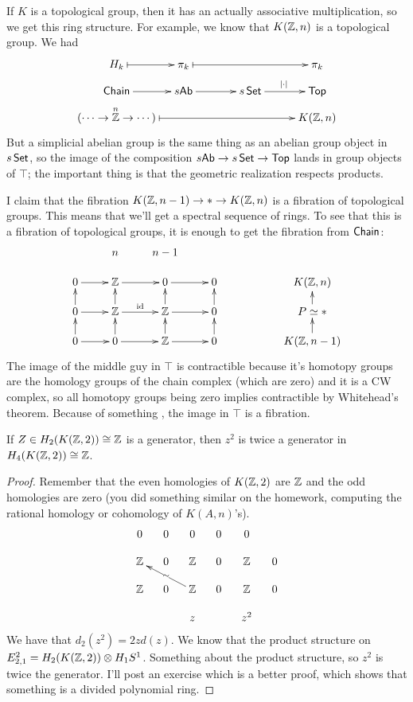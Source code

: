 \begin{example}
 If $K$ is a topological group, then it has an actually associative multiplication, so we get this ring structure. For example, we know that $K(\mathbb{Z},n)$ is a topological group. We had
 \[\xymatrix@!0 @R=2pc @C=5pc{
  H_k\ar@{|->}[r] & \pi_k \ar@{|->}[rr] & & \pi_k\\
  \chain \ar[r] & s\ab \ar[r] & s\set \ar[r]^{|\cdot|} & \top\\
  (\cdots\to \overset{n}{\ZZ}\to \cdots) \ar@{|->}[rrr] & & & K(\ZZ,n)
 }\]
 But a simplicial abelian group is the same thing as an abelian group object in $s\operatorname{\sf Set}$, so the image of the composition $s\text{\sf Ab}\to s\operatorname{\sf Set}\to \text{\sf Top}$ lands in group objects of $\top$; the important thing is that the geometric realization respects products.
 
 I claim that the fibration $K(\mathbb{Z},n-1)\to *\to K(\mathbb{Z},n)$ is a fibration of topological groups. This means that we'll get a spectral sequence of rings. To see that this is a fibration of topological groups, it is enough to get the fibration from $\text{\sf Chain}$:
 \[\xymatrix@R-1pc{
  & n & n-1 \\
  0\ar[r] & \ZZ \ar[r] & 0\ar[r] & 0 & & K(\ZZ,n)\\
  0\ar[r]\ar[u] & \ZZ\ar[u]\ar[r]^\id & \ZZ\ar[u] \ar[r] & 0\ar[u] & & P\simeq *\ar[u]\\
  0\ar[r]\ar[u] & 0\ar[u]\ar[r] & \ZZ \ar[r]\ar[u] & 0\ar[u] & & K(\ZZ,n-1)\ar[u]
 }\]
 The image of the middle guy in $\top$ is contractible because it's homotopy groups are the homology groups of the chain complex (which are zero) and it is a CW complex, so all homotopy groups being zero implies contractible by Whitehead's theorem. Because of something \anton{}, the image in $\top$ is a fibration.
\end{example}
\begin{lemma}
 If $Z\in H_2(K(\mathbb{Z},2))\cong \mathbb{Z}$ is a generator, then $z^2$ is twice a generator in $H_4(K(\mathbb{Z},2))\cong \mathbb{Z}$.
\end{lemma}
\begin{proof}
 Remember that the even homologies of $K(\mathbb{Z},2)$ are $\mathbb{Z}$ and the odd homologies are zero (you did something similar on the homework, computing the rational homology or cohomology of $K(A,n)$'s).
 \[\xymatrix@-1pc{
  0&0&0&0&0\\
  \ZZ&0&\ZZ&0&\ZZ&0\\
  \ZZ&0&\ZZ\ar[ull]|{\sim}&0&\ZZ&0 \\
  & & z & & z^2
 }\]
 We have that $d_2(z^2)=2zd(z)$. We know that the product structure on $E^2_{2,1}=H_2(K(\mathbb{Z},2))\otimes H_1S^1$. Something about the product structure, so $z^2$ is twice the generator. I'll post an exercise which is a better proof, which shows that something is a divided polynomial ring.
\end{proof}
